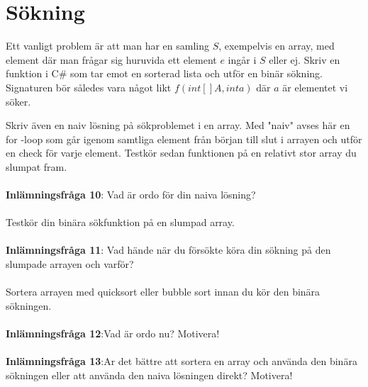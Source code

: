 \documentclass{article}
\begin{document}
\section*{Sökning}
Ett vanligt problem är att man har en samling $S$, exempelvis en array, med element där man frågar sig huruvida ett element $e$ ingår i $S$ eller ej. Skriv en funktion i C\# som tar emot en sorterad lista och utför en binär sökning. Signaturen bör således vara något likt $f(int[ ] A, int a) $ där $a$ är elementet vi söker.

Skriv även en naiv lösning på sökproblemet i en array. Med "naiv" avses här en for -loop
som går igenom samtliga element från början till slut i arrayen och utför en check för
varje element. Testkör sedan funktionen på en relativt stor array du slumpat fram. \\\\
\textbf{Inlämningsfråga 10}: Vad är ordo för din naiva lösning? \\\\
Testkör din binära sökfunktion på en slumpad array. 
\\\\

\textbf{Inlämningsfråga 11}: Vad hände när du försökte köra din sökning på den slumpade arrayen och varför?\\\\
Sortera arrayen med quicksort eller bubble sort innan du kör den binära sökningen. \\\\
\textbf{Inlämningsfråga 12}:Vad är ordo nu? Motivera! \\\\
\textbf{Inlämningsfråga 13}:Ar det bättre att sortera en array och använda den binära sökningen eller att använda
den naiva lösningen direkt? Motivera!
\end{document}
